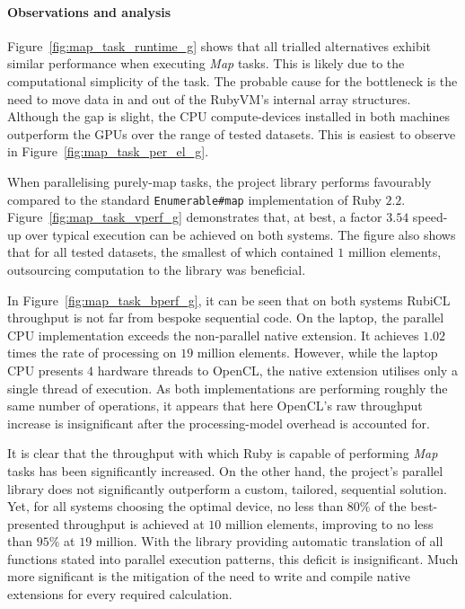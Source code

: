 \paragraph*{Observations and analysis}
Figure~\ref{fig:map_task_runtime_g} shows that all trialled alternatives exhibit similar performance when executing \emph{Map} tasks.
This is likely due to the computational simplicity of the task. The probable cause for the bottleneck is the need to move data in and out of the RubyVM's internal array structures.
Although the gap is slight, the \ac{CPU} compute-devices installed in both machines outperform the \acp{GPU} over the range of tested datasets. This is easiest to observe in Figure~\ref{fig:map_task_per_el_g}.

When parallelising purely-map tasks, the project library performs favourably compared to the standard \verb|Enumerable#map| implementation of Ruby $2.2$. Figure~\ref{fig:map_task_vperf_g} demonstrates that, at best, a factor $3.5$\textendash$4$ speed-up over typical execution can be achieved on both systems.
The figure also shows that for all tested datasets, the smallest of which contained $1$ million elements, outsourcing computation to the library was beneficial.

In Figure~\ref{fig:map_task_bperf_g}, it can be seen that on both systems RubiCL throughput is not far from bespoke sequential code. On the laptop, the parallel \ac{CPU} implementation exceeds the non-parallel native extension. It achieves $1.02$ times the rate of processing on $19$ million elements.
However, while the laptop \ac{CPU} presents $4$ hardware threads to \ac{OpenCL}, the native extension utilises only a single thread of execution. As both implementations are performing roughly the same number of operations, it appears that here \ac{OpenCL}'s raw throughput increase is insignificant after the processing-model overhead is accounted for.

It is clear that the throughput with which Ruby is capable of performing \emph{Map} tasks has been significantly increased.
On the other hand, the project's parallel library does not significantly outperform a custom, tailored, sequential solution.
Yet, for all systems choosing the optimal device, no less than $80\%$ of the best-presented throughput is achieved at $10$ million elements, improving to no less than $95\%$ at $19$ million.
With the library providing automatic translation of all functions stated into parallel execution patterns, this deficit is insignificant. Much more significant is the mitigation of the need to write and compile native extensions for every required calculation.

